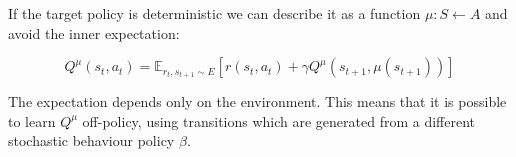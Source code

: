 If the target policy is deterministic we can describe it as a function \(\mu :
S \leftarrow A\) and avoid the inner expectation:

\begin{equation}
    Q^\mu\left(s_t, a_t\right) = \mathbb{E}_{r_t, s_{t + 1} \sim E}
    \left[r\left(s_t, a_t\right) + \gamma Q^\mu\left(s_{t + 1}, \mu\left(s_{t +
    1}\right)\right)\right]
\end{equation}

The expectation depends only on the environment. This means that it is possible
to learn \(Q^\mu\) off-policy, using transitions which are generated from a
different stochastic behaviour policy \(\beta\).
